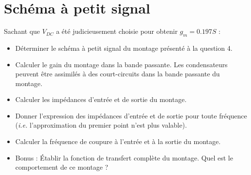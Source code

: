 \documentclass{../template/tp}
\newcommand{\ifgv}[1]{\ifthenelse{\boolean{corrige}}{}{#1}} %
\begin{document}
\ifgv{\newpage}


\section{Schéma à petit signal}

\Question
{
Sachant que $V_{DC}$ a été judicieusement choisie pour obtenir $g_m=0.197S$ :
 
 \begin{itemize}
 \item Déterminer le schéma à petit signal du montage présenté à la question 4.
 \item Calculer le gain du montage dans la bande passante. Les condensateurs peuvent être assimilés à des court-circuits dans la bande passante du montage.
 \item Calculer les impédances d'entrée et de sortie du montage.
 \item Donner l'expression des impédances d'entrée et de sortie pour toute fréquence (\textit{i.e.} l'approximation du premier point n'est plus valable).
 \item Calculer la fréquence de coupure à l'entrée et à la sortie du montage.
 \item Bonus : Établir la fonction de transfert complète du montage. Quel est le comportement de ce montage ?
 \end{itemize}

}
\end{document}
